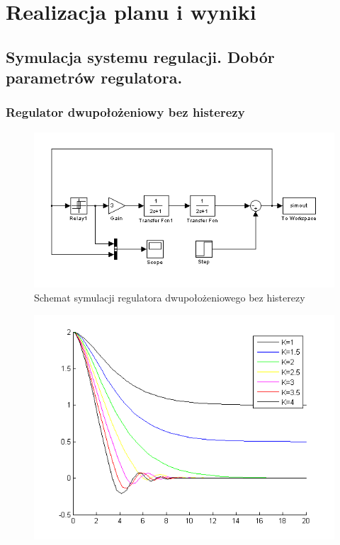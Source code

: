 \documentclass[a4paper,10pt]{article}
\begin{document}
\newpage
\section{Realizacja planu i wyniki}
\subsection{Symulacja systemu regulacji. Dobór parametrów regulatora.}\label{sec:zad1}
\subsubsection{Regulator dwupołożeniowy bez histerezy}\label{sec:r2bh}
\begin{figure}[h]
    \centering
	\includegraphics[width=120mm]{CW3-schemat-2bez.png}
	\caption{Schemat symulacji regulatora dwupołożeniowego bez histerezy}
    \label{fig:Rysunek}
\end{figure}

\begin{figure}[h]
    \centering
	\includegraphics[width=120mm]{CW3-wykres-2bez.png}
	\caption{}
    \label{fig:Rysunek}
\end{figure}
\end{document}

